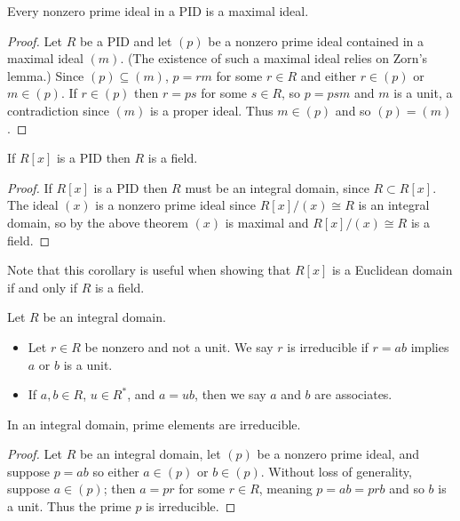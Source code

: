 \documentclass[../m171main.tex]{subfiles}
\begin{document}
\begin{theorem}[]
    Every nonzero prime ideal in a PID is a maximal ideal.
\end{theorem}

\begin{proof}
    Let $R$ be a PID and let $(p)$ be a nonzero prime ideal contained in a maximal ideal $(m)$.
    (The existence of such a maximal ideal relies on Zorn's lemma.)
    Since $(p) \subseteq (m)$, $p = rm$ for some $r \in R$ and either $r \in (p)$ or $m \in (p)$.
    If $r \in (p)$ then $r = ps$ for some $s \in R$, so $p = psm$ and $m$ is a unit, a contradiction since $(m)$ is a proper ideal.
    Thus $m \in (p)$ and so $(p) = (m)$.
\end{proof}

\begin{theorem}[]
    If $R[x]$ is a PID then $R$ is a field.
\end{theorem}

\begin{proof}
    If $R[x]$ is a PID then $R$ must be an integral domain, since $R \subset R[x]$.
    The ideal $(x)$ is a nonzero prime ideal since $R[x] / (x) \cong R$ is an integral domain, so by the above theorem $(x)$ is maximal and $R[x] / (x) \cong R$ is a field.
\end{proof}

Note that this corollary is useful when showing that $R[x]$ is a Euclidean domain if and only if $R$ is a field.

\begin{definition}[Irredicubility]
    Let $R$ be an integral domain.
    \begin{itemize}[topsep=0pt]
        \item Let $r \in R$ be nonzero and not a unit.
        We say $r$ is irreducible if $r = ab$ implies $a$ or $b$ is a unit.

        \item If $a,b \in R$, $u \in R^*$, and $a = ub$, then we say $a$ and $b$ are associates.
    \end{itemize}
\end{definition}

\begin{theorem}[]
    In an integral domain, prime elements are irreducible.
\end{theorem}

\begin{proof}
    Let $R$ be an integral domain, let $(p)$ be a nonzero prime ideal, and suppose $p = ab$ so either $a \in (p)$ or $b \in (p)$.
    Without loss of generality, suppose $a \in (p)$; then $a = pr$ for some $r \in R$, meaning $p = ab = prb$ and so $b$ is a unit.
    Thus the prime $p$ is irreducible.
\end{proof}
\end{document}
